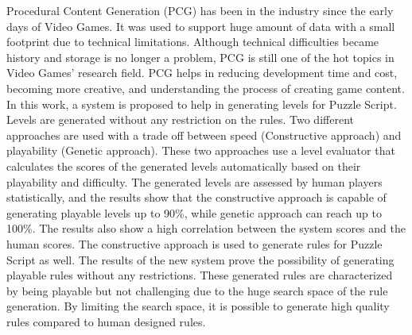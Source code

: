 Procedural Content Generation (PCG) has been in the industry since the early days of Video Games. It was used to support huge amount of data with a small footprint due to technical limitations. Although technical difficulties became history and storage is no longer a problem, PCG is still one of the hot topics in Video Games' research field. PCG helps in reducing development time and cost, becoming more creative, and understanding the process of creating game content. In this work, a system is proposed to help in generating levels for Puzzle Script. Levels are generated without any restriction on the rules. Two different approaches are used with a trade off between speed (Constructive approach) and playability (Genetic approach). These two approaches use a level evaluator that calculates the scores of the generated levels automatically based on their playability and difficulty. The generated levels are assessed by human players statistically, and the results show that the constructive approach is capable of generating playable levels up to 90\%, while genetic approach can reach up to 100\%. The results also show a high correlation between the system scores and the human scores. The constructive approach is used to generate rules for Puzzle Script as well. The results of the new system prove the possibility of generating playable rules without any restrictions. These generated rules are characterized by being playable but not challenging due to the huge search space of the rule generation. By limiting the search space, it is possible to generate high quality rules compared to human designed rules.